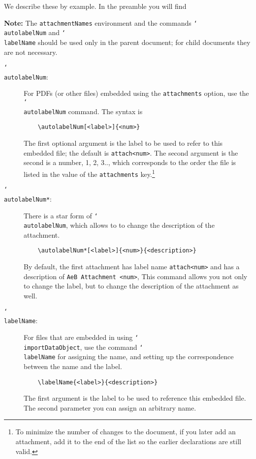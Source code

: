 \documentclass{article}
\newcommand{\cs}[1]{\texttt{\char`\\#1}}
\def\aftersverbskip{\noindent}
\newenvironment{sverbatim}
{\par\small\verbatim}
{\endverbatim\par\aftergroup\aftersverbskip}
\begin{document}
We describe these by example. In the preamble you will find
\begin{sverbatim}
\end{sverbatim}
\textbf{\color{red}Note:} The \texttt{attachmentNames} environment
and the commands \cs{autolabel\-Num} and \cs{labelName} should be
used only in the parent document; for child documents they are not
necessary.

\begin{description}

\item[\cs{autolabelNum}:] For PDFs (or other files) embedded using the
\texttt{attachments} option, use the \cs{autolabelNum} command. The
syntax is
\begin{verbatim}
    \autolabelNum[<label>]{<num>}
\end{verbatim}
The first optional argument is the label to be used to refer to this
embedded file; the default is \texttt{attach<num>}. The second
argument is the second is a number, 1, 2, 3.., which
corresponds to the order the file is listed in the value of the
\texttt{attachments} key.\footnote{To minimize the number of changes
to the document, if you later add an attachment, add it to the end
of the list so the earlier declarations are still valid.}

\item[\cs{autolabelNum*}:] There is a star form of \cs{autolabelNum}, which
allows to to change the description of the attachment.
\begin{verbatim}
    \autolabelNum*[<label>]{<num>}{<description>}
\end{verbatim}
By default, the first attachment has label name \texttt{attach<num>}
and has a description of \texttt{AeB Attachment <num>}, This command
allows you not only to change the label, but to change the description
of the attachment as well.

\item[\cs{labelName}:] For files that are embedded in using
\cs{importDataObject}, use the command \cs{labelName} for assigning
the name, and setting up the correspondence between the name and the
label.
\begin{verbatim}
    \labelName{<label>}{<description>}
\end{verbatim}
The first argument is the label to be used to reference this
embedded file.  The second parameter you can assign an arbitrary
name.
\end{description}
\end{document}
